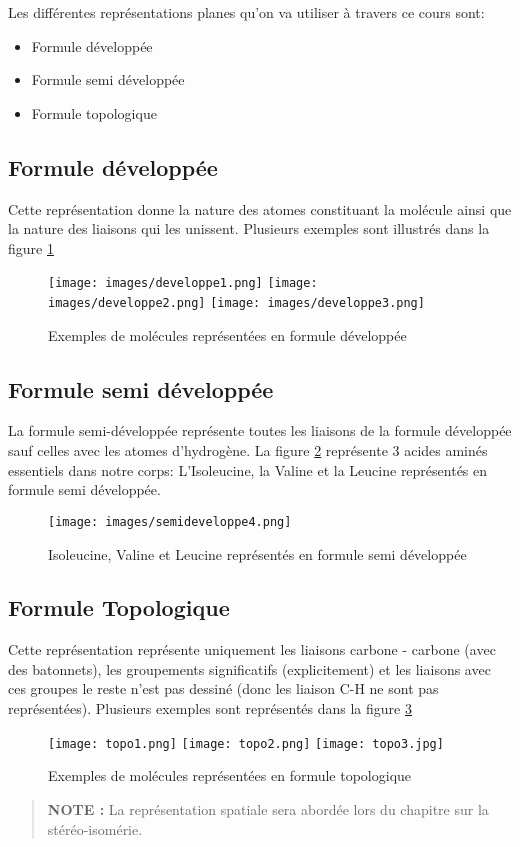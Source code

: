 \documentclass[a4paper, oneside]{book}
\begin{document}
Les différentes représentations planes qu'on va utiliser à travers ce cours sont:

\begin{itemize}
    \item Formule développée 
    \item Formule semi développée 
    \item Formule topologique
\end{itemize}
\subsection{Formule développée}
Cette représentation donne la nature des atomes constituant la molécule ainsi que la nature des liaisons qui les unissent. Plusieurs exemples sont illustrés dans la figure \ref{fig:developpe_examples}
\begin{figure}[!ht]
    \centering
    \texttt{[image: images/developpe1.png]}
    \texttt{[image: images/developpe2.png]}
    \texttt{[image: images/developpe3.png]}
    \caption{Exemples de molécules représentées en formule développée}
    \label{fig:developpe_examples}
\end{figure}
\subsection{Formule semi développée}
La formule semi-développée représente toutes les liaisons de la formule développée sauf celles avec les atomes d’hydrogène. La figure \ref{fig:semi_dev_example} représente 3 acides aminés essentiels dans notre corps: L'Isoleucine, la Valine et la Leucine représentés en formule semi développée.
\begin{figure}[!h]
    \centering
    \texttt{[image: images/semideveloppe4.png]}
    \caption{Isoleucine, Valine et Leucine représentés en formule semi développée}
    \label{fig:semi_dev_example}
\end{figure}
\subsection{Formule Topologique}
Cette représentation représente uniquement les liaisons carbone - carbone (avec des batonnets), les groupements significatifs (explicitement) et les liaisons avec ces groupes le reste n'est pas dessiné (donc les liaison C-H ne sont pas représentées). Plusieurs exemples sont représentés dans la figure \ref{fig:topo_example}
\begin{figure}[ht]
    \centering
    \texttt{[image: topo1.png]}
    \texttt{[image: topo2.png]}
    \texttt{[image: topo3.jpg]}
    \caption{Exemples de molécules représentées en formule topologique}
    \label{fig:topo_example}
\end{figure}
\begin{quote}
    \textbf{NOTE :} La représentation spatiale sera abordée lors du chapitre sur la stéréo-isomérie.
\end{quote}
\end{document}
